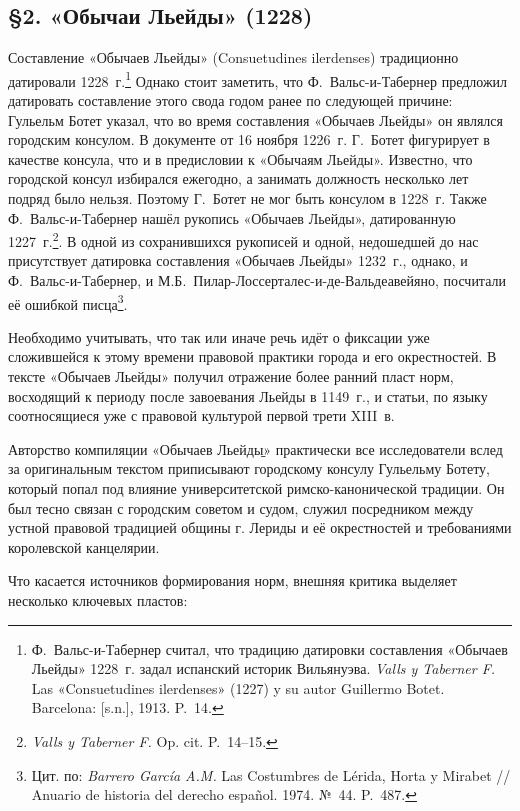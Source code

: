 \subsection*{§2. «Обычаи Льейды» (1228)}

Составление «Обычаев Льейды» (Consuetudines ilerdenses) традиционно датировали 1228~г.\footnote{Ф.~Вальс-и-Табернер считал, что традицию датировки составления «Обычаев Льейды» 1228~г. задал испанский историк Вильянуэва. \emph{Valls y Taberner F.} Las «Consuetudines ilerdenses» (1227) y su autor Guillermo Botet. Barcelona: [s.n.], 1913. P.~14.} Однако стоит заметить, что Ф.~Вальс-и-Табернер предложил датировать составление этого свода годом ранее по следующей причине: Гульельм Ботет указал, что во время составления «Обычаев Льейды» он являлся городским консулом. В документе от 16 ноября 1226~г. Г.~Ботет фигурирует в качестве консула, что и в предисловии к «Обычаям Льейды». Известно, что городской консул избирался ежегодно, а занимать должность несколько лет подряд было нельзя. Поэтому Г.~Ботет не мог быть консулом в 1228~г. Также Ф.~Вальс-и-Табернер нашёл рукопись «Обычаев Льейды», датированную 1227~г.\footnote{\emph{Valls y Taberner F. }Op. cit. P.~14--15.}. В одной из сохранившихся рукописей и одной, недошедшей до нас присутствует датировка составления «Обычаев Льейды» 1232~г., однако, и Ф.~Вальс-и-Табернер, и М.Б.~Пилар-Лоссерталес-и-де-Вальдеавейяно, посчитали её ошибкой писца\footnote{Цит. по: \emph{Barrero García A.M.} Las Costumbres de Lérida, Horta y Mirabet // Anuario de historia del derecho español. 1974. №~44. P.~487.}.

Необходимо учитывать, что так или иначе речь идёт о фиксации уже сложившейся к этому времени правовой практики города и его окрестностей. В тексте «Обычаев Льейды» получил отражение более ранний пласт норм, восходящий к периоду после завоевания Льейды в 1149~г., и статьи, по языку соотносящиеся уже с правовой культурой первой трети XIII~в.

Авторство компиляции «Обычаев Льейды{\unicodefallback ̱}» практически все исследователи вслед за оригинальным текстом приписывают городскому консулу Гульельму Ботету, который попал под влияние университетской римско-канонической традиции. Он был тесно связан с городским советом и судом, служил посредником между устной правовой традицией общины г. Лериды и её окрестностей и требованиями королевской канцелярии.

Что касается источников формирования норм, внешняя критика выделяет несколько ключевых пластов:

